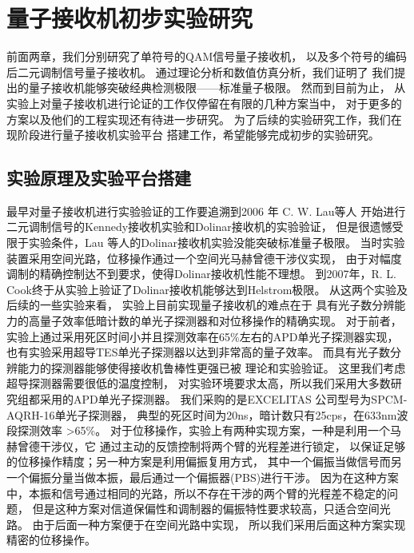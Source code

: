 \chapter{量子接收机初步实验研究}
前面两章，我们分别研究了单符号的QAM信号量子接收机，
以及多个符号的编码后二元调制信号量子接收机。
通过理论分析和数值仿真分析，我们证明了
我们提出的量子接收机能够突破经典检测极限——标准量子极限。
然而到目前为止，
从实验上对量子接收机进行论证的工作仅停留在有限的几种方案当中，
对于更多的方案以及他们的工程实现还有待进一步研究。
为了后续的实验研究工作，我们在现阶段进行量子接收机实验平台
搭建工作，希望能够完成初步的实验研究。


\section{实验原理及实验平台搭建}
最早对量子接收机进行实验验证的工作要追溯到2006 年 C. W. Lau等人
开始进行二元调制信号的Kennedy接收机实验和Dolinar接收机的实验验证\cite{lau2006binary}，
但是很遗憾受限于实验条件，Lau 等人的Dolinar接收机实验没能突破标准量子极限。
当时实验装置采用空间光路，位移操作通过一个空间光马赫曾德干涉仪实现，
由于对幅度调制的精确控制达不到要求，使得Dolinar接收机性能不理想。
到2007年，R. L. Cook终于从实验上验证了Dolinar接收机能够达到Helstrom极限\cite{cook2007optical}。
从这两个实验及后续的一些实验来看\cite{wittmann2008demonstration,wittmann2010demonstration,tsujino2010sub,
tsujino2011quantum,becerra2011m,chen2012optical,muller2012quadrature,becerra2013experimental,
becerra2015photon}，
实验上目前实现量子接收机的难点在于
具有光子数分辨能力的高量子效率低暗计数的单光子探测器和对位移操作的精确实现。
对于前者，实验上通过采用死区时间小并且探测效率在65\%左右的APD单光子探测器实现，
也有实验采用超导TES单光子探测器以达到非常高的量子效率\cite{tsujino2011quantum}。
而具有光子数分辨能力的探测器能够使得接收机鲁棒性更强已被
理论和实验验证\cite{izumi2013quantum,li2013suppressing,becerra2015photon}。
这里我们考虑超导探测器需要很低的温度控制，
对实验环境要求太高，所以我们采用大多数研究组都采用的APD单光子探测器。
我们采购的是EXCELITAS 公司型号为SPCM-AQRH-16单光子探测器，
典型的死区时间为20ns，暗计数只有25cps，在633nm波段探测效率
>65\%。
对于位移操作，实验上有两种实现方案，一种是利用一个马赫曾德干涉仪，它
通过主动的反馈控制将两个臂的光程差进行锁定，
以保证足够的位移操作精度\cite{becerra2013experimental,
becerra2015photon}；另一种方案是利用偏振复用方式，
其中一个偏振当做信号而另一个偏振分量当做本振，最后通过一个偏振器(PBS)进行干涉\cite{wittmann2008demonstration,wittmann2010demonstration}。
因为在这种方案中，本振和信号通过相同的光路，所以不存在干涉的两个臂的光程差不稳定的问题，
但是这种方案对信道保偏性和调制器的偏振特性要求较高，只适合空间光路。
由于后面一种方案便于在空间光路中实现，
所以我们采用后面这种方案实现精密的位移操作。


